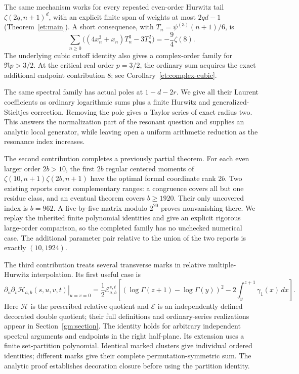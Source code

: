 \documentclass[11pt,a4paper]{article}
\numberwithin{equation}{section}
\theoremstyle{definition}
\theoremstyle{remark}
\begin{document}
The same mechanism works for every repeated even-order Hurwitz tail
\(\zeta(2q,n+1)^d\), with an explicit finite span of weights at most
$2qd-1$ (Theorem~\ref{et:main}). A short consequence, with
$T_n=\psi^{(3)}(n+1)/6$, is
\[
 \sum_{n\ge0}\bigl((4x_n^3+x_n)T_n^3-3T_n^2\bigr)
                                      =-\frac94\zeta(8).
\]
The underlying cubic cutoff identity also gives a complex-order family
for $\Re p>3/2$. At the critical real order $p=3/2$, the ordinary
sum acquires the exact additional endpoint contribution $8$;
see Corollary~\ref{et:complex-cubic}.

The same spectral family has actual poles at $1-d-2r$. We give all their
Laurent coefficients as ordinary logarithmic sums plus a finite Hurwitz
and generalized-Stieltjes correction. Removing the pole gives a Taylor
series of exact radius two. This answers the normalization part of the
resonant question and supplies an analytic local generator, while leaving
open a uniform arithmetic reduction as the resonance index increases.

The second contribution completes a previously partial theorem. For
each even larger order $2b>10$, the first $2b$ regular centered moments
of $\zeta(10,n+1)\zeta(2b,n+1)$ have the optimal formal coordinate
rank $2b$. Two existing reports cover complementary ranges: a congruence
covers all but one residue class, and an eventual theorem covers
$b\ge1920$. Their only uncovered index is $b=962$. A five-by-five
matrix modulo $2^{20}$ proves nonvanishing there. We replay the inherited
finite polynomial identities and give an explicit rigorous large-order
comparison, so the completed family has no unchecked numerical case.
The additional parameter pair relative to the union of the two reports
is exactly $(10,1924)$.

The third contribution treats several transverse marks in relative
multiple-Hurwitz interpolation. Its first useful case is
\begin{equation}\label{intro:gamma}
\left.\partial_u\partial_v\mathcal H_{a,b}(s,u,v,t)\right|_{u=v=0}
=\frac12\mathcal E_{a,b}^{s,t}\!\left[
 (\log\Gamma(z+1)-\log\Gamma(y))^2
                  -2\int_y^{z+1}\gamma_1(x)\,dx\right].
\end{equation}
Here $\mathcal H$ is the prescribed relative quotient and $\mathcal E$
is an independently defined decorated double quotient; their full
definitions and ordinary-series realizations appear in
Section~\ref{gm:section}. The identity holds for arbitrary independent
spectral arguments and endpoints in the right half-plane. Its extension
uses a finite set-partition polynomial. Identical marked clusters give
individual ordered identities; different marks give their complete
permutation-symmetric sum. The analytic proof establishes decoration
closure before using the partition identity.
\end{document}
